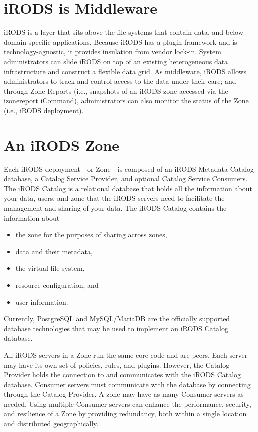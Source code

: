 \documentclass[10pt,oneside]{memoir}
\begin{document}
\section{iRODS is Middleware}

iRODS is a layer that sits above the file systems that contain data, and below domain-specific applications. Because iRODS has a plugin framework and is technology-agnostic, it provides insulation from vendor lock-in. System administrators can slide iRODS on top of an existing heterogeneous data infrastructure and construct a flexible data grid. As middleware, iRODS allows administrators to track and control access to the data under their care; and through Zone Reports (i.e., snapshots of an iRODS zone accessed via the izonereport iCommand), administrators can also monitor the status of the Zone (i.e., iRODS deployment).


\section{An iRODS Zone}

Each iRODS deployment---or Zone---is composed of an iRODS Metadata Catalog database, a Catalog Service Provider, and optional Catalog Service Consumers. The iRODS Catalog is a relational database that holds all the information about your data, users, and zone that the iRODS servers need to facilitate the management and sharing of your data. The iRODS Catalog contains the information about
 \begin{itemize}
 \item the zone for the purposes of sharing across zones,
 \item data and their metadata,
 \item the virtual file system,
 \item resource configuration, and
 \item user information.
 \end{itemize}

Currently, PostgreSQL and MySQL/MariaDB are the officially supported database technologies that may be used to implement an iRODS Catalog database.

All iRODS servers in a Zone run the same core code and are peers. Each server may have its own set of policies, rules, and plugins. However, the Catalog Provider holds the connection to and communicates with the iRODS Catalog database. Consumer servers must communicate with the database by connecting through the Catalog Provider. A zone may have as many Consumer servers as needed. Using multiple Consumer servers can enhance the performance, security, and resilience of a Zone by providing redundancy, both within a single location and distributed geographically.
\end{document}
